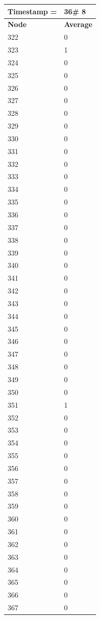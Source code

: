 \begin{tabular}{|l||l|}
\hline
\textbf{Timestamp =} & \textbf{36}\# 8\\\hline
	\textbf{Node} & \textbf{Average} \\ \hline
\hline
	322 & 0 \\ \hline
	323 & 1 \\ \hline
	324 & 0 \\ \hline
	325 & 0 \\ \hline
	326 & 0 \\ \hline
	327 & 0 \\ \hline
	328 & 0 \\ \hline
	329 & 0 \\ \hline
	330 & 0 \\ \hline
	331 & 0 \\ \hline
	332 & 0 \\ \hline
	333 & 0 \\ \hline
	334 & 0 \\ \hline
	335 & 0 \\ \hline
	336 & 0 \\ \hline
	337 & 0 \\ \hline
	338 & 0 \\ \hline
	339 & 0 \\ \hline
	340 & 0 \\ \hline
	341 & 0 \\ \hline
	342 & 0 \\ \hline
	343 & 0 \\ \hline
	344 & 0 \\ \hline
	345 & 0 \\ \hline
	346 & 0 \\ \hline
	347 & 0 \\ \hline
	348 & 0 \\ \hline
	349 & 0 \\ \hline
	350 & 0 \\ \hline
	351 & 1 \\ \hline
	352 & 0 \\ \hline
	353 & 0 \\ \hline
	354 & 0 \\ \hline
	355 & 0 \\ \hline
	356 & 0 \\ \hline
	357 & 0 \\ \hline
	358 & 0 \\ \hline
	359 & 0 \\ \hline
	360 & 0 \\ \hline
	361 & 0 \\ \hline
	362 & 0 \\ \hline
	363 & 0 \\ \hline
	364 & 0 \\ \hline
	365 & 0 \\ \hline
	366 & 0 \\ \hline
	367 & 0 \\ \hline
\end{tabular}
